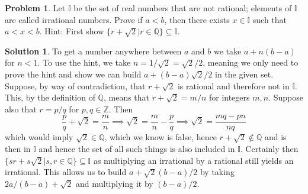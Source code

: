 \documentclass[10pt]{article}
\theoremstyle{definition}
\newtheorem{problem}{Problem}
\newtheorem{soln}{Solution}
\begin{document}
\begin{problem}
Let $\mathbb{I}$ be the set of real numbers that are not rational; elements of $\mathbb{I}$ are
called irrational numbers. Prove if $a < b$, then there exists $x\in \mathbb{I}$ such that
$a < x < b$. Hint: First show $\{r + \sqrt{2} | r\in\mathbb{Q}\} \subseteq \mathbb{I}$.
\end{problem}
\begin{soln}
  To get a number anywhere between $a$ and $b$
  we take $a+n(b-a)$ for $n<1$. To use the hint, we take $n=1/\sqrt{2}=\sqrt{2}/2$, meaning
  we only need to prove the hint and show we can build $a+(b-a)\sqrt{2}/2$ in the given set. Suppose, by way of contradiction,
  that $r + \sqrt{2}$ is rational and therefore not in $\mathbb{I}$. This, by the definition of $\mathbb{Q}$, means that
  $r+\sqrt{2}=m/n$ for integers $m,n$. Suppose also that $r=p/q$ for $p,q\in\mathbb{Z}$. Then
  $$\frac{p}{q}+\sqrt{2}=\frac{m}{n}\implies \sqrt{2}=\frac{m}{n}-\frac{p}{q}\implies \sqrt{2}=\frac{mq-pn}{nq}$$
  which would imply $\sqrt{2}\in\mathbb{Q}$, which we know is false, hence $r+\sqrt{2}\notin \mathbb{Q}$ and is then in $\mathbb{I}$ and
  hence the set of all such things is also included in $\mathbb{I}$. Certainly then
  $\{sr + s\sqrt{2} | s,r\in\mathbb{Q}\} \subseteq \mathbb{I}$ as multiplying an irrational by a rational still yields an irrational.
  This allows us to build $a+\sqrt{2}(b-a)/2$ by taking $2a/(b-a)+\sqrt{2}$ and multiplying it by $(b-a)/2$.
\end{soln}
\end{document}
